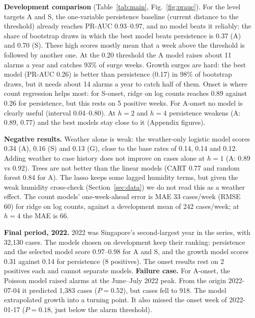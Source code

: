 \textbf{Development comparison} (Table~\ref{tab:main}, Fig.~\ref{fig:prauc}). For the level
targets A and S, the one-variable persistence baseline (current distance to the threshold)
already reaches PR-AUC 0.93--0.97, and no model beats it reliably: the share of bootstrap
draws in which the best model beats persistence is 0.37 (A) and 0.70 (S). These high scores
mostly mean that a week above the threshold is followed by another one. At the 0.20 threshold
the A model raises about 11 alarms a year and catches 93\% of surge weeks. Growth surges are
hard: the best model (PR-AUC 0.26) is better than persistence (0.17) in 98\% of bootstrap
draws, but it needs about 14 alarms a year to catch half of them. Onset is where count
regression helps most: for S-onset, ridge on log counts reaches 0.89 against 0.26 for
persistence, but this rests on 5 positive weeks. For A-onset no model is clearly useful
(interval 0.04--0.80). At $h=2$ and $h=4$ persistence weakens (A: 0.89, 0.77) and the best
models stay close to it (Appendix figures).

\textbf{Negative results.} Weather alone is weak: the weather-only logistic model scores 0.34
(A), 0.16 (S) and 0.13 (G), close to the base rates of 0.14, 0.14 and 0.12. Adding weather to
case history does not improve on cases alone at $h=1$ (A: 0.89 vs 0.92). Trees are not better
than the linear models (CART 0.77 and random forest 0.84 for A). The lasso keeps some lagged
humidity terms, but given the weak humidity cross-check (Section~\ref{sec:data}) we do not
read this as a weather effect. The count models' one-week-ahead error is MAE 33 cases/week
(RMSE 60) for ridge on log counts, against a development mean of 242 cases/week; at $h=4$ the
MAE is 66.

\textbf{Final period, 2022.} 2022 was Singapore's second-largest year in the series, with
32{,}130 cases. The models chosen on development keep their ranking:
persistence and the selected model score 0.97--0.98 for A and S, and the growth model scores
0.31 against 0.14 for persistence (8 positives). The onset results rest on 2 positives each and
cannot separate models.
\textbf{Failure case.} For A-onset, the Poisson model raised alarms at the June--July 2022 peak.
From the origin 2022-07-04 it predicted 1{,}383 cases ($P=0.52$), but cases fell to 918. The
model extrapolated growth into a turning point. It also missed the onset week of
2022-01-17 ($P=0.18$, just below the alarm threshold).

